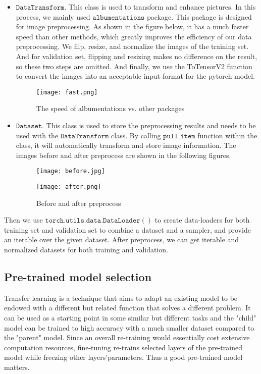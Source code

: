 \documentclass[final]{cvpr}
\begin{document}
\begin{itemize}
    \item $\mathtt{DataTransform}$. This class is used to transform and enhance pictures. In this process, we mainly used $\mathtt{albumentations}$ package. This package is designed for image preprocessing. As shown in the figure below, it has a much faster speed than other methods, which greatly improves the efficiency of our data preprocessing. We flip, resize, and normalize the images of the training set. And for validation set, flipping and resizing makes no difference on the result, so these two steps are omitted. And finally, we use the ToTensorV2 function to convert the images into an acceptable input format for the pytorch model.
    \begin{figure}[htbp]
        \centering
        \texttt{[image: fast.png]}
        \caption{The speed of albumentations vs. other packages}
    \end{figure}
    \item $\mathtt{Dataset}$. This class is used to store the preprocessing results and needs to be used with the $\mathtt{DataTransform}$ class. By calling $\mathtt{pull\_item}$ function within the class, it will automatically transform and store image information. The images before and after preprocess are shown in the following figures.
\begin{figure}[htbp] 
\begin{minipage}[t]{0.49\linewidth} 
    \centering
    \texttt{[image: before.jpg]} 
\end{minipage}
\begin{minipage}[t]{0.49\linewidth} 
    \centering
    \texttt{[image: after.png]}
\end{minipage}
  \caption{Before and after preprocess}
\end{figure}
\end{itemize} 

Then we use $\mathtt{torch.utils.data.DataLoader()}$ to create data-loaders for both training set and validation set to combine a dataset and a sampler, and provide an iterable over the given dataset. After preprocess, we can get iterable and normalized datasets for both training and validation.

\subsection{Pre-trained model selection}
 Transfer learning is a technique that aims to adapt an existing model to be endowed with a different but related function that solves a different problem. It can be used as a starting point in some similar but different tasks and the "child" model can be trained to high accuracy with a much smaller dataset compared to the "parent" model. Since an overall re-training would essentially cost extensive computation resources, fine-tuning re-trains selected layers of the pre-trained model while freezing other layers’parameters. Thus a good pre-trained model matters.
\end{document}
